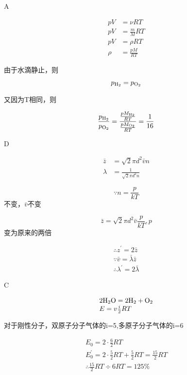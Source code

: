 \exercise A

\solve

$$
\begin{aligned} 
p V & = \nu R T \\ p V & = \frac { m } { M } R T \\
p V & = \rho R T \\
\rho & = \frac { p M } { R T }
\end{aligned}
$$

由于水滴静止，则
$$
p_{\ce{H2}} =p_{\ce{O2}}
$$

又因为T相同，则

$$
\frac { p _ {\ce{H2}} } { p _ {\ce{O2}} } = \frac { \frac { p M _ {\ce{H2}} } { R T } } { \frac { p M_{\ce{O2}}}{ R T}}=\frac{1}{16}
$$

\exercise D

\solve

$$
\begin{aligned}
 \bar { z } & = \sqrt { 2 } \pi d ^ { 2 } \bar { v } n \\ \lambda & = \frac { 1 } { \sqrt { 2 } \pi d ^ { 2 } n } 
\end{aligned}
$$

$$
\because n = \frac { p } { k T }
$$不变，$ \bar { v }$不变

$$
\bar { z } = \sqrt { 2 } \pi d ^ { 2 } \bar { v } \frac { p } { k T },p
$$变为原来的两倍

$$
\begin{array} { l } 
{ \therefore z ^ { \prime } = 2 \bar { z } } \\ 
{ \because \bar { v } = \bar { \lambda } \bar { z } } \\
 { \therefore \lambda ^ { \prime } = 2 \bar { \lambda } }
\end{array}
$$

\exercise C

\solve

$$
\begin{array} { l } 
{ 2\ce{H2O} = 2\ce{H2}+\ce{O2}}\\
{ E = v\frac{i}{2}RT} 
\end{array}
$$

对于刚性分子，双原子分子气体的i=5,多原子分子气体的i=6

$$
\begin{array} { l }
 E _ { 0 } = 2 \cdot \frac { 6 } { 2 } R T \\ E _ { 0 } ^ { \prime } = 2 \cdot \frac { 5 } { 2 } R T + \frac { 5 } { 2 } R T = \frac { 15 } { 2 } R T \\ \therefore \frac { 15 } { 2 } R T \div 6 R T = 125 \% 
\end{array}
$$


